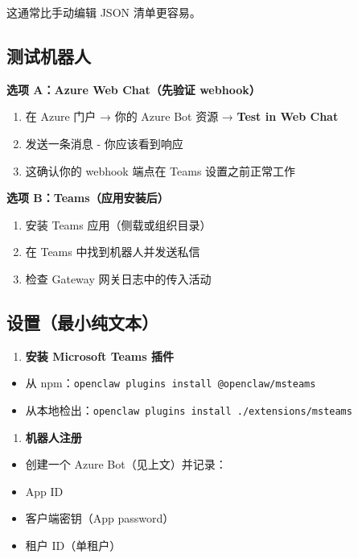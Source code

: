 这通常比手动编辑 JSON 清单更容易。

\subsection{测试机器人}


\textbf{选项 A：Azure Web Chat（先验证 webhook）}

\begin{enumerate}
  \item 在 Azure 门户 → 你的 Azure Bot 资源 → \textbf{Test in Web Chat}
  \item 发送一条消息 - 你应该看到响应
  \item 这确认你的 webhook 端点在 Teams 设置之前正常工作
\end{enumerate}


\textbf{选项 B：Teams（应用安装后）}

\begin{enumerate}
  \item 安装 Teams 应用（侧载或组织目录）
  \item 在 Teams 中找到机器人并发送私信
  \item 检查 Gateway 网关日志中的传入活动
\end{enumerate}


\subsection{设置（最小纯文本）}


\begin{enumerate}
  \item \textbf{安装 Microsoft Teams 插件}
\end{enumerate}

\begin{itemize}
  \item 从 npm：\texttt{openclaw plugins install @openclaw/msteams}
  \item 从本地检出：\texttt{openclaw plugins install ./extensions/msteams}
\end{itemize}


\begin{enumerate}
  \item \textbf{机器人注册}
\end{enumerate}

\begin{itemize}
  \item 创建一个 Azure Bot（见上文）并记录：
  \item App ID
  \item 客户端密钥（App password）
  \item 租户 ID（单租户）
\end{itemize}


